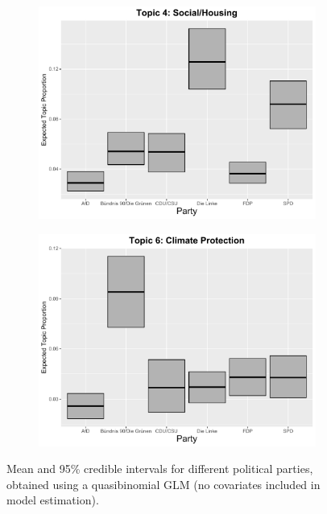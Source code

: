 \begin{figure}[h!]
  \centering
  \captionsetup{justification=centering,margin=2cm}
  \begin{subfigure}[b]{0.4\linewidth}
    \includegraphics[width=\linewidth]{../plots/6_1/quasi_t4_cat_ctm.pdf}
  \end{subfigure}
  \begin{subfigure}[b]{0.4\linewidth}
    \includegraphics[width=\linewidth]{../plots/6_1/quasi_t6_cat_ctm.pdf}
  \end{subfigure}
  \caption{Mean and 95\% credible intervals for different political parties,
obtained using a quasibinomial GLM (no covariates included in model estimation).}
  \label{fig:quasi_t46_cat_ctm}
\end{figure}

